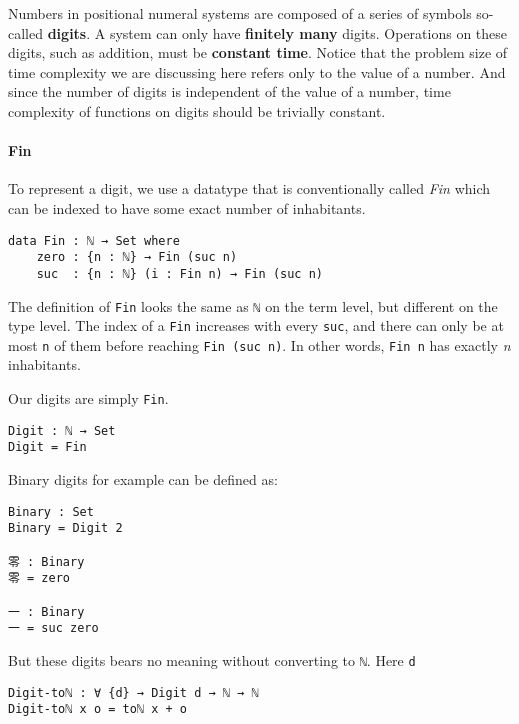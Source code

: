 \documentclass[12pt, a4paper]{article}
\begin{document}
Numbers in positional numeral systems are composed of a series of symbols
so-called \textbf{digits}. A system can only have \textbf{finitely many} digits.
Operations on these digits, such as addition, must be \textbf{constant time}.
Notice that the problem size of time complexity we are discussing here refers
only to the value of a number. And since the number of digits is independent of
the value of a number, time complexity of functions on digits should be trivially
constant.

\paragraph{Fin}
To represent a digit, we use a datatype that is conventionally called \textit{Fin}
which can be indexed to have some exact number of inhabitants.

\begin{lstlisting}
data Fin : ℕ → Set where
    zero : {n : ℕ} → Fin (suc n)
    suc  : {n : ℕ} (i : Fin n) → Fin (suc n)
\end{lstlisting}

The definition of {\lstinline|Fin|} looks the same as {\lstinline|ℕ|} on the term
level, but different on the type level. The index of a {\lstinline|Fin|} increases
with every {\lstinline|suc|}, and there can only be at most {\lstinline|n|} of
them before reaching {\lstinline|Fin (suc n)|}. In other words, {\lstinline|Fin n|}
has exactly \textit{n} inhabitants.

Our digits are simply {\lstinline|Fin|}.

\begin{lstlisting}
Digit : ℕ → Set
Digit = Fin
\end{lstlisting}

Binary digits for example can be defined as:

\begin{lstlisting}
Binary : Set
Binary = Digit 2

零 : Binary
零 = zero

一 : Binary
一 = suc zero
\end{lstlisting}

But these digits bears no meaning without converting to {\lstinline|ℕ|}.
Here {\lstinline|d|}

\begin{lstlisting}
Digit-toℕ : ∀ {d} → Digit d → ℕ → ℕ
Digit-toℕ x o = toℕ x + o
\end{lstlisting}

\end{document}
